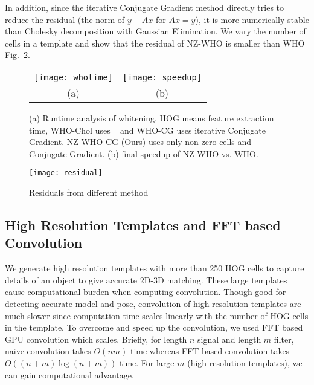In addition, since the iterative Conjugate Gradient method directly
tries to reduce the residual (the norm of $y-Ax$ for $Ax = y$), it is
more numerically stable than Cholesky decomposition with Gaussian
Elimination. We vary the number of cells in a template and show that
the residual of NZ-WHO is smaller than WHO Fig.~\ref{fig:whoresidual}.

\begin{figure}[t]
  \begin{center}
  \begin{tabular}{cc}
     \texttt{[image: whotime]} & 
     \texttt{[image: speedup]}\\
     (a) & (b) \\
 \end{tabular}
  \end{center}
  \caption{(a) Runtime analysis of whitening. HOG means feature
    extraction time, WHO-Chol uses ~\cite{Hariharan12} and
    WHO-CG uses iterative Conjugate Gradient. NZ-WHO-CG (Ours) uses only
    non-zero cells and Conjugate Gradient. (b) final speedup
    of NZ-WHO vs. WHO.}
  \label{fig:whotime}
\end{figure}
%
\begin{figure}[t]
  \centering
  \texttt{[image: residual]}
  \caption{Residuals from different method}
  \label{fig:whoresidual}
\end{figure}


\subsection{High Resolution Templates and FFT based Convolution}
\label{sec:fft} 
We generate high resolution templates with more than 250 HOG cells to capture
details of an object to give accurate 2D-3D matching. These large templates
cause computational burden when computing convolution. Though good for
detecting accurate model and pose, convolution of high-resolution templates are
much slower since computation time scales linearly with the number of HOG
cells in the template. To overcome and speed up the convolution, we used FFT
based GPU convolution \cite{Podlozhnyuk} which scales. Briefly, for length $n$ signal and
length $m$ filter, naive convolution takes $O(nm)$ time whereas FFT-based
convolution takes $O\left( (n + m)\log (n+m) \right)$ time. For large
$m$ (high resolution templates), we can gain computational advantage.
